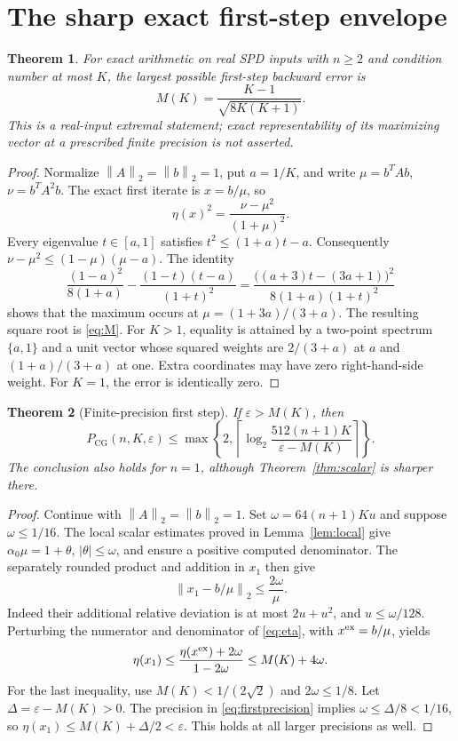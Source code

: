 \documentclass[11pt]{article}
\newtheorem{theorem}{Theorem}[section]
\theoremstyle{remark}\newtheorem{remark}[theorem]{Remark}
\newcommand{\norm}[1]{\left\lVert#1\right\rVert_2}
\newcommand{\PCG}{P_{\mathrm{CG}}}
\newcommand{\eps}{\varepsilon}
\begin{document}
\section{The sharp exact first-step envelope}
\label{sec:first}

\begin{theorem}\label{thm:firstexact}
For exact arithmetic on real SPD inputs with $n\ge2$ and condition number
at most $K$, the largest possible first-step backward error is
\begin{equation}\label{eq:M}
M(K)=\frac{K-1}{\sqrt{8K(K+1)}}.
\end{equation}
This is a real-input extremal statement; exact representability of its
maximizing vector at a prescribed finite precision is not asserted.
\end{theorem}
\begin{proof}
Normalize $\norm A=\norm b=1$, put $a=1/K$, and write
$\mu=b^TAb$, $\nu=b^TA^2b$. The exact first iterate is $x=b/\mu$, so
\[
\eta(x)^2=\frac{\nu-\mu^2}{(1+\mu)^2}.
\]
Every eigenvalue $t\in[a,1]$ satisfies
$t^2\le(1+a)t-a$. Consequently
$\nu-\mu^2\le(1-\mu)(\mu-a)$. The identity
\[
\frac{(1-a)^2}{8(1+a)}-
\frac{(1-t)(t-a)}{(1+t)^2}
=
\frac{\bigl((a+3)t-(3a+1)\bigr)^2}
     {8(1+a)(1+t)^2}
\]
shows that the maximum occurs at $\mu=(1+3a)/(3+a)$.
The resulting square root is \eqref{eq:M}.
For $K>1$, equality is attained by a two-point spectrum $\{a,1\}$ and
a unit vector whose squared weights are $2/(3+a)$ at $a$ and
$(1+a)/(3+a)$ at one. Extra coordinates may have zero right-hand-side
weight. For $K=1$, the error is identically zero.
\end{proof}

\begin{theorem}[Finite-precision first step]\label{thm:firstfinite}
If $\eps>M(K)$, then
\begin{equation}\label{eq:firstprecision}
\PCG(n,K,\eps)\le
\max\left\{2,\left\lceil\log_2
\frac{512(n+1)K}{\eps-M(K)}\right\rceil\right\}.
\end{equation}
The conclusion also holds for $n=1$, although Theorem~\ref{thm:scalar}
is sharper there.
\end{theorem}
\begin{proof}
Continue with $\norm A=\norm b=1$. Set
$\omega=64(n+1)Ku$ and suppose $\omega\le1/16$.
The local scalar estimates proved in Lemma~\ref{lem:local} give
$\alpha_0\mu=1+\theta$, $|\theta|\le\omega$, and ensure a positive
computed denominator. The separately rounded product and addition in
$x_1$ then give
\[
\norm{x_1-b/\mu}\le\frac{2\omega}{\mu}.
\]
Indeed their additional relative deviation is at most $2u+u^2$, and
$u\le\omega/128$. Perturbing the numerator and denominator of
\eqref{eq:eta}, with $x^{\rm ex}=b/\mu$, yields
\[
\eta(x_1)\le\frac{\eta(x^{\rm ex})+2\omega}{1-2\omega}
\le M(K)+4\omega.
\]
For the last inequality, use $M(K)<1/(2\sqrt2)$ and $2\omega\le1/8$.
Let $\Delta=\eps-M(K)>0$. The precision in \eqref{eq:firstprecision}
implies $\omega\le\Delta/8<1/16$, so
$\eta(x_1)\le M(K)+\Delta/2<\eps$. This holds at all larger precisions
as well.
\end{proof}
\end{document}
